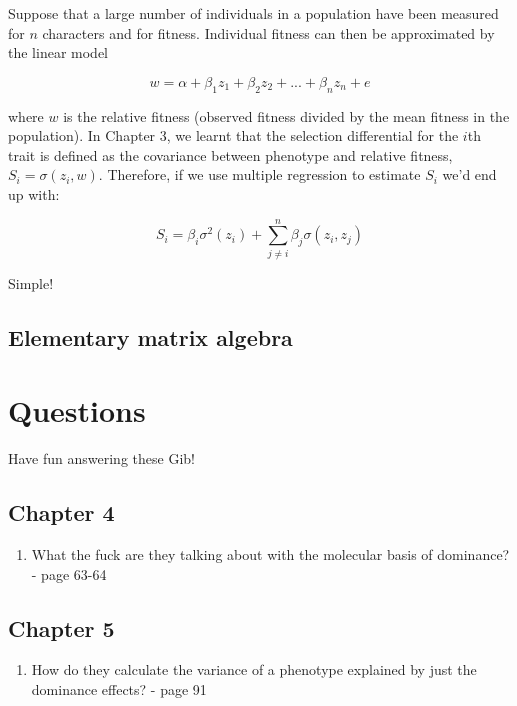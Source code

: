 \documentclass[
]{book}
\providecommand{\tightlist}{%
  \setlength{\itemsep}{0pt}\setlength{\parskip}{0pt}}
\begin{document}
Suppose that a large number of individuals in a population have been measured for \(n\) characters and for fitness. Individual fitness can then be approximated by the linear model

\begin{equation}
    w = \alpha + \beta_1z_1 + \beta_2z_2 + ... + \beta_nz_n + e
    \label{eq:fitness-linear-model}
\end{equation}

where \(w\) is the relative fitness (observed fitness divided by the mean fitness in the population). In Chapter 3, we learnt that the selection differential for the \(i\)th trait is defined as the covariance between phenotype and relative fitness, \(S_i = \sigma(z_i, w)\). Therefore, if we use multiple regression to estimate \(S_i\) we'd end up with:

\begin{equation}
    S_i = \beta_i\sigma^2(z_i) + \sum^n_{j \neq i} {\beta_j\sigma(z_i, z_j)}
    \label{eq:ith-selection-differential} 
\end{equation}

Simple!

\hypertarget{elementary-matrix-algebra}{%
\section{Elementary matrix algebra}\label{elementary-matrix-algebra}}

\hypertarget{questions}{%
\chapter*{Questions}\label{questions}}

Have fun answering these Gib!

\hypertarget{chapter-4}{%
\section*{Chapter 4}\label{chapter-4}}

\begin{enumerate}
\def\labelenumi{\arabic{enumi}.}
\tightlist
\item
  What the fuck are they talking about with the molecular basis of dominance? - page 63-64
\end{enumerate}

\hypertarget{chapter-5}{%
\section*{Chapter 5}\label{chapter-5}}

\begin{enumerate}
\def\labelenumi{\arabic{enumi}.}
\tightlist
\item
  How do they calculate the variance of a phenotype explained by just the dominance effects? - page 91
\end{enumerate}
\end{document}
